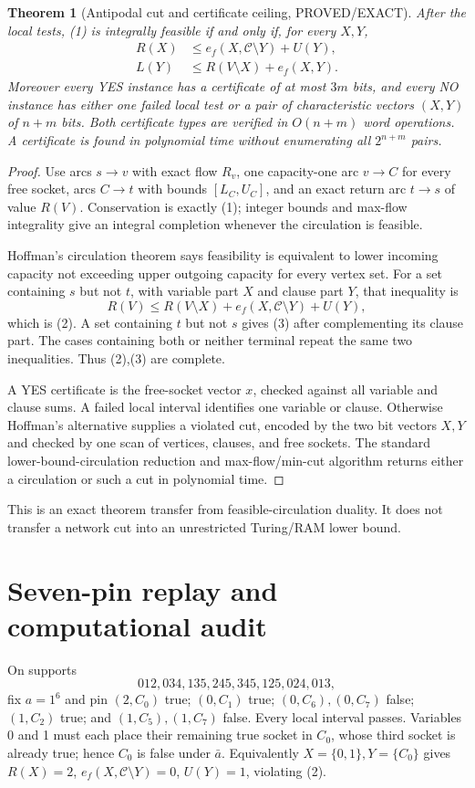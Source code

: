\documentclass[11pt]{article}
\newtheorem{theorem}{Theorem}
\begin{document}
\begin{theorem}[Antipodal cut and certificate ceiling, PROVED/EXACT]
After the local tests, (1) is integrally feasible if and only if, for every $X,Y$,
\begin{align}
R(X)&\le e_f(X,\mathcal C\setminus Y)+U(Y), \tag{2}\\
L(Y)&\le R(V\setminus X)+e_f(X,Y). \tag{3}
\end{align}
Moreover every YES instance has a certificate of at most $3m$ bits, and every NO instance has either one failed local test or a pair of characteristic vectors $(X,Y)$ of $n+m$ bits.  Both certificate types are verified in $O(n+m)$ word operations.  A certificate is found in polynomial time without enumerating all $2^{n+m}$ pairs.
\end{theorem}
\begin{proof}
Use arcs $s\to v$ with exact flow $R_v$, one capacity-one arc $v\to C$ for every free socket, arcs $C\to t$ with bounds $[L_C,U_C]$, and an exact return arc $t\to s$ of value $R(V)$.  Conservation is exactly (1); integer bounds and max-flow integrality give an integral completion whenever the circulation is feasible.

Hoffman's circulation theorem says feasibility is equivalent to lower incoming capacity not exceeding upper outgoing capacity for every vertex set.  For a set containing $s$ but not $t$, with variable part $X$ and clause part $Y$, that inequality is
\[
R(V)\le R(V\setminus X)+e_f(X,\mathcal C\setminus Y)+U(Y),
\]
which is (2).  A set containing $t$ but not $s$ gives (3) after complementing its clause part.  The cases containing both or neither terminal repeat the same two inequalities.  Thus (2),(3) are complete.

A YES certificate is the free-socket vector $x$, checked against all variable and clause sums.  A failed local interval identifies one variable or clause.  Otherwise Hoffman's alternative supplies a violated cut, encoded by the two bit vectors $X,Y$ and checked by one scan of vertices, clauses, and free sockets.  The standard lower-bound-circulation reduction and max-flow/min-cut algorithm returns either a circulation or such a cut in polynomial time.
\end{proof}
This is an exact theorem transfer from feasible-circulation duality.  It does not transfer a network cut into an unrestricted Turing/RAM lower bound.

\section{Seven-pin replay and computational audit}
On supports
\[
012,034,135,245,345,125,024,013,
\]
fix $a=1^6$ and pin $(2,C_0)$ true; $(0,C_1)$ true; $(0,C_6),(0,C_7)$ false; $(1,C_2)$ true; and $(1,C_5),(1,C_7)$ false.  Every local interval passes.  Variables 0 and 1 must each place their remaining true socket in $C_0$, whose third socket is already true; hence $C_0$ is false under $\bar a$.  Equivalently $X=\{0,1\},Y=\{C_0\}$ gives $R(X)=2$, $e_f(X,\mathcal C\setminus Y)=0$, $U(Y)=1$, violating (2).
\end{document}
